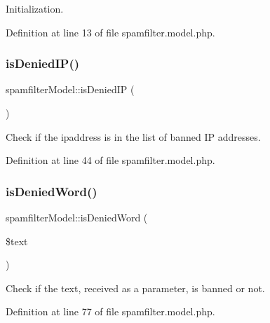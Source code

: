 Initialization. 



Definition at line 13 of file spamfilter.\+model.\+php.

\hypertarget{classspamfilterModel_a4f657cf632890244b2664acff0ee8706}{}\label{classspamfilterModel_a4f657cf632890244b2664acff0ee8706} 
\subsubsection{\texorpdfstring{is\+Denied\+I\+P()}{isDeniedIP()}}
{\footnotesize\ttfamily spamfilter\+Model\+::is\+Denied\+IP (\begin{DoxyParamCaption}{ }\end{DoxyParamCaption})}



Check if the ipaddress is in the list of banned IP addresses. 



Definition at line 44 of file spamfilter.\+model.\+php.

\hypertarget{classspamfilterModel_a5661bac60c32b451cbda5f7a9587b13e}{}\label{classspamfilterModel_a5661bac60c32b451cbda5f7a9587b13e} 
\subsubsection{\texorpdfstring{is\+Denied\+Word()}{isDeniedWord()}}
{\footnotesize\ttfamily spamfilter\+Model\+::is\+Denied\+Word (\begin{DoxyParamCaption}\item[{}]{\$text }\end{DoxyParamCaption})}



Check if the text, received as a parameter, is banned or not. 



Definition at line 77 of file spamfilter.\+model.\+php.

\hypertarget{classspamfilterModel_a6b92cb33d6204158cff0baca2d9f3f4b}{}\label{classspamfilterModel_a6b92cb33d6204158cff0baca2d9f3f4b} 
